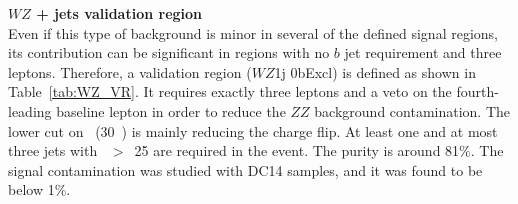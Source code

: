 \begin{table}[htb!]
\caption{\ttbar\ + $Z$ validation region definition ($ttZ$ 1bIncl = $ttZ$ 1bExcl || $ttZ$ 2bIncl).}
\label{tab:ttZ_VR}
\begin{center}
\end{center}
\end{table}
\begin{table}[htb!]
\caption{\ttbar\ + $V$ validation region definition ($ttV$ 2bIncl). }
\label{tab:ttV_VR}
\begin{center}
\end{center}
\end{table}

\par{\bf $WZ$ + jets validation region\\}
Even if this type of background is minor in several of the defined signal regions, its contribution can be significant in regions with no $b$ jet requirement and three leptons. Therefore, a validation region ($WZ$1j 0bExcl) is defined as shown in Table~\ref{tab:WZ_VR}. It requires exactly three leptons and a veto on the fourth-leading baseline lepton in order to reduce the $ZZ$ background contamination. The lower cut on \met\ (30~\GeV) is mainly reducing the charge flip. At least one and at most three jets with \pt~$>$~25 \GeV are required in the event. The purity is around 81$\%$. The signal contamination was studied with DC14 samples, and it was found to be below 1$\%$.

